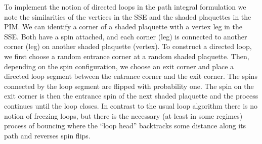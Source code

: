 \documentclass[10pt,pre,aps,twocolumn,showpacs,superscriptaddress,
floatfix]{revtex4}
\begin{document}
To implement the notion of directed loops in the path integral formulation 
we note the similarities of the vertices in the SSE and the shaded plaquettes
in the PIM. We can identify a corner of a shaded plaquette with a vertex leg 
in the SSE. Both have a spin attached, and each corner (leg) is connected to 
another corner (leg) on another shaded plaquette (vertex). To construct a
directed loop, we first choose a 
random entrance corner at a random shaded plaquette. Then, depending on the 
spin configuration, we choose an exit corner and place a directed loop segment
between the entrance corner and the exit corner. The spins connected by the 
loop segment are flipped with probability one. The spin on the 
exit corner is then the entrance spin of the next shaded plaquette and the 
process continues until the loop closes. In contrast to the usual loop 
algorithm there is no notion of freezing loops, but there is the necessary 
(at least in some regimes) process of bouncing where the ``loop head'' 
backtracks some distance along its path and reverses spin flips.
  
\end{document}

